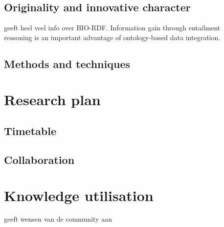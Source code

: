 \documentclass[twoside,fontsize=10pt]{article}
\begin{document}
\subsection*{Originality and innovative character} 
\cite{Sahoo2008} geeft heel veel info over BIO-RDF. Information gain through entailment reasoning is an important advantage of ontology-based data integration.
\subsection*{Methods and techniques} %
\section*{Research plan}
\subsection*{Timetable}
\subsection*{Collaboration}
\section*{Knowledge utilisation}
\cite{Gomez-Cabrero2014} geeft wensen van de community aan
\end{document}
